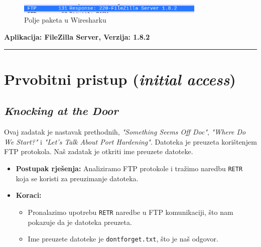\documentclass{article}
\begin{document}
\begin{figure}[h]
    \centering
    \includegraphics[width=0.8\textwidth]{Let's Talk About Port Hardening.png}
    \caption{Polje paketa u Wiresharku}
    \label{fig:flag_wireshark}
\end{figure}

\begin{center}
    \textbf{Aplikacija: FileZilla Server, Verzija: 1.8.2}
\end{center}

\noindent\rule{\textwidth}{0.4pt}

\newpage
\section{Prvobitni pristup (\textit{initial access})}
\label{sec:access}
\subsection{\textit{Knocking at the Door}}
\begin{tcolorbox}[
    colback=gray!5,  %
    colframe=gray!75,  %
    title=\textbf{Zadatak}]
    Ovaj zadatak je nastavak prethodnih, \textit{"Something Seems Off Doc"}, \textit{"Where Do We Start?"} i \textit{"Let's Talk About Port Hardening"}. Datoteka je preuzeta korištenjem FTP protokola. Naš zadatak je otkriti ime preuzete datoteke.
\end{tcolorbox}

\begin{itemize}
    \item \textbf{Postupak rješenja:} Analiziramo FTP protokole i tražimo naredbu \texttt{RETR} koja se koristi za preuzimanje datoteka.
    \item \textbf{Koraci:}
    \begin{itemize}
        \item Pronalazimo upotrebu \texttt{RETR} naredbe u FTP komunikaciji, što nam pokazuje da je datoteka preuzeta.
        \item Ime preuzete datoteke je \texttt{dontforget.txt}, što je naš odgovor.
    \end{itemize}
\end{itemize}
\end{document}
